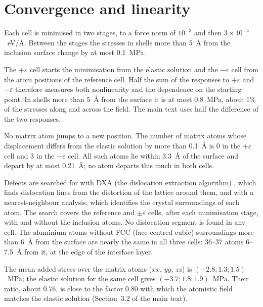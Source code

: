\documentclass[11pt,a4paper]{article}
\begin{document}
\section{Convergence and linearity}

Each cell is minimised in two stages, to a force norm of $10^{-3}$ and then
$3\times10^{-4}$~eV/\AA. Between the stages the stresses in shells more than
5~\AA{} from the inclusion surface change by at most 0.1~MPa.

The $+\varepsilon$ cell starts the minimisation from the elastic solution and
the $-\varepsilon$ cell from the atom positions of the reference cell. Half
the sum of the responses to $+\varepsilon$ and $-\varepsilon$ therefore
measures both nonlinearity and the dependence on the starting point. In
shells more than 5~\AA{} from the surface it is at most 0.8~MPa, about
1\% of the stresses along and across the field. The main text uses half
the difference of the two responses.

No matrix atom jumps to a new position. The number of matrix atoms whose
displacement differs from the elastic solution by more than 0.1~\AA{} is
0 in the $+\varepsilon$ cell and 3 in the $-\varepsilon$ cell.
All such atoms lie within 3.3~\AA{} of the surface and depart by at
most 0.21~\AA; no atom departs this much in both cells.

Defects are searched for with DXA (the dislocation extraction algorithm)
\cite{Stukowski2012DXA}, which finds dislocation lines from the distortion of
the lattice around them, and with a nearest-neighbour analysis, which
identifies the crystal surroundings of each atom. The search covers the
reference and $\pm\varepsilon$ cells, after each minimisation stage, with and
without the inclusion atoms. No dislocation segment is found in any cell. The
aluminium atoms without FCC (face-centred cubic) surroundings more than 6~\AA{}
from the surface are nearly the same in all three cells: 36--37 atoms
6--7.5~\AA{} from it, at the edge of the interface layer.

The mean added stress over the matrix atoms ($xx$, $yy$, $zz$) is
$(-2.8; 1.3; 1.5)$~MPa; the elastic solution for the same cell gives $(-3.7; 1.8; 1.9)$~MPa.
Their ratio, about 0.76, is close to the factor 0.80 with which the
atomistic field matches the elastic solution (Section~3.2 of the main text).
\end{document}
